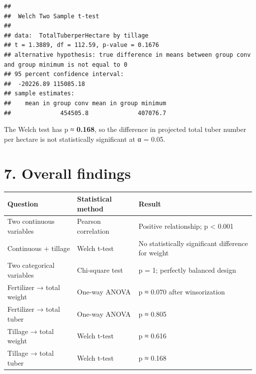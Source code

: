 \documentclass[
]{article}
\newcounter{none} %
\begin{document}
\begin{verbatim}
## 
##  Welch Two Sample t-test
## 
## data:  TotalTuberperHectare by tillage
## t = 1.3889, df = 112.59, p-value = 0.1676
## alternative hypothesis: true difference in means between group conv and group minimum is not equal to 0
## 95 percent confidence interval:
##  -20226.89 115085.18
## sample estimates:
##    mean in group conv mean in group minimum 
##              454505.8              407076.7
\end{verbatim}

The Welch test has p ≈ \textbf{0.168}, so the difference in projected
total tuber number per hectare is not statistically significant at α =
0.05.

\section{7. Overall findings}\label{overall-findings}

{\def\LTcaptype{none} %
\begin{longtable}[]{@{}
  >{\raggedright\arraybackslash}p{}
  >{\raggedright\arraybackslash}p{}
  >{\raggedright\arraybackslash}p{}@{}}
\toprule\noalign{}
\begin{minipage}[b]{\linewidth}\raggedright
Question
\end{minipage} & \begin{minipage}[b]{\linewidth}\raggedright
Statistical method
\end{minipage} & \begin{minipage}[b]{\linewidth}\raggedright
Result
\end{minipage} \\
\midrule\noalign{}
\endhead
\bottomrule\noalign{}
\endlastfoot
Two continuous variables & Pearson correlation & Positive relationship;
p \textless{} 0.001 \\
Continuous + tillage & Welch t-test & No statistically significant
difference for weight \\
Two categorical variables & Chi-square test & p = 1; perfectly balanced
design \\
Fertilizer → total weight & One-way ANOVA & p ≈ 0.070 after
winsorization \\
Fertilizer → total tuber & One-way ANOVA & p ≈ 0.805 \\
Tillage → total weight & Welch t-test & p ≈ 0.616 \\
Tillage → total tuber & Welch t-test & p ≈ 0.168 \\
\end{longtable}
}
\end{document}

